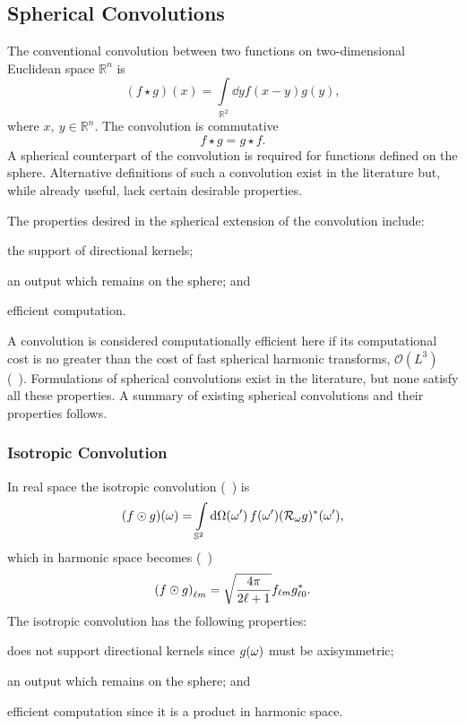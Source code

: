 \subsection{Spherical Convolutions}\label{sec:chapter2_spherical_convolutions}

The conventional convolution between two functions on two-dimensional Euclidean space \(\mathbb{R}^{n}\) is
%
\begin{equation}
	(f \star g)(x) = \int\limits_{\mathbb{R}^{2}} \dd{y} f(x-y) g(y),
\end{equation}
%
where \(x,\ y \in \mathbb{R}^{n}\).
The convolution is commutative
%
\begin{equation}
	f \star g = g \star f.
\end{equation}
%
A spherical counterpart of the convolution is required for functions defined on the sphere.
Alternative definitions of such a convolution exist in the literature but, while already useful, lack certain desirable properties.

The properties desired in the spherical extension of the convolution include:
%
\begin{inparaenum}[(i)]
	\item the support of directional kernels;
	\item an output which remains on the sphere; and
	\item efficient computation.
\end{inparaenum}
%
A convolution is considered computationally efficient here if its computational cost is no greater than the cost of fast spherical harmonic transforms, \ie{} \(\mathcal{O}(L^{3})\) (\eg{}~\cite{Driscoll1994,McEwen2011}).
Formulations of spherical convolutions exist in the literature, but none satisfy all these properties.
A summary of existing spherical convolutions and their properties follows.

\subsubsection{Isotropic Convolution}

In real space the isotropic convolution (\eg{}~\cite{McEwen2007,Wei2011,Kennedy2011}) is
%
\begin{equation}
	\pixel{(f \odot g)} = \integrateSphere{\omega'} \pixel[']{f} \pixel[']{\conj{(\rotation{\omega}g)}},
\end{equation}
%
which in harmonic space becomes (\eg{}~\cite{McEwen2007})
%
\begin{equation}\label{eq:chapter2_isotropic_harmonic}
	\harmonic{(f \odot g)} = \sqrt{\inverseFactor} \harmonic{f} \conj{\axiHarmonic{g}}.
\end{equation}
%
The isotropic convolution has the following properties:
%
\begin{inparaenum}[(i)]
	\item does not support directional kernels since \(\pixel{g}\) must be axisymmetric;
	\item an output which remains on the sphere; and
	\item efficient computation since it is a product in harmonic space.
\end{inparaenum}

